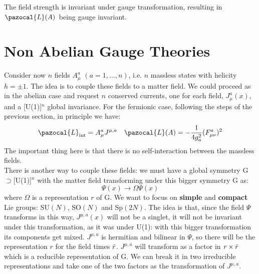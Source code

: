 \documentclass[../main.tex]{subfiles}
\begin{document}
The field strength is invariant under gauge transformation, resulting in $\pazocal{L}(A)$ being gauge invariant. 
\section{Non Abelian Gauge Theories}
Consider now $n$ fields $A_\mu^a$ $(a=1,\dots,n)$, i.e. $n$ massless states with helicity $h=\pm1$. The idea is to couple these fields to a matter field. We could proceed as in the abelian case and request $n$ conserved currents, one for each field, $J_\mu^a(x)$, and a [U(1)]$^n$ global invariance. For the fermionic case, following the steps of the previous section, in principle we have:
\[
\pazocal{L}_{\text{int}}=A_\mu^a J^{\mu,a} \quad \pazocal{L}(A)=-\frac{1}{4g_a^2}(F_{\mu\nu}^a)^2
\]
The important thing here is that there is no self-interaction between the massless fields.\\
There is another way to couple these fields: we must have a global symmetry G$\supset$[U(1)]$^n$ with the matter field transforming under this bigger symmetry G as:
\[
\Psi(x)\to\Omega\Psi(x)
\]
where $\Omega$ is a representation $r$ of G. We want to focus on \textbf{simple} and \textbf{compact} Lie groups: SU$(N)$, SO$(N)$ and  Sp$(2N)$. The idea is that, since the field $\Psi$ transforms in this way, $J^{\mu,a}(x)$ will not be a singlet, it will not be invariant under this transformation, as it was under U(1): with this bigger transformation its components get mixed. $J^{\mu,a}$ is hermitian and bilinear in $\Psi$, so there will be the representation $r$ for the field times $\Bar{r}$. $J^{\mu,a}$ will transform as a factor in $r\times\Bar{r}$ which is a reducible representation of G. We can break it in two irreducible representations and take one of the two factors as the transformation of $J^{\mu,a}$.
\end{document}
